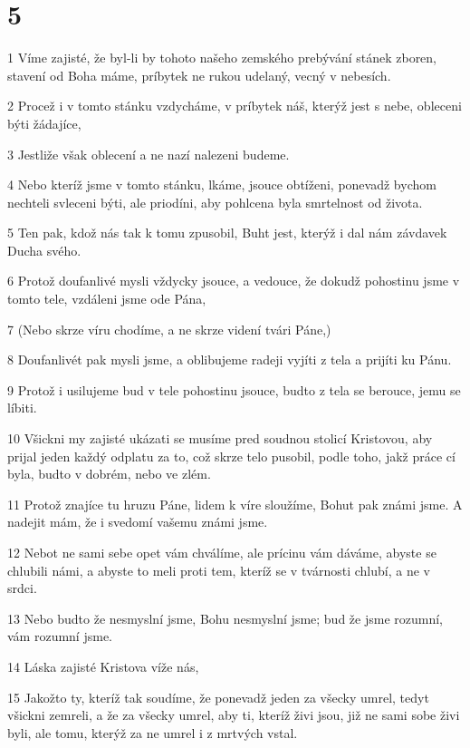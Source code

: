 \chapter{5}

\par 1 Víme zajisté, že byl-li by tohoto našeho zemského prebývání stánek zboren, stavení od Boha máme, príbytek ne rukou udelaný, vecný v nebesích.
\par 2 Procež i v tomto stánku vzdycháme, v príbytek náš, kterýž jest s nebe, obleceni býti žádajíce,
\par 3 Jestliže však oblecení a ne nazí nalezeni budeme.
\par 4 Nebo kteríž jsme v tomto stánku, lkáme, jsouce obtíženi, ponevadž bychom nechteli svleceni býti, ale priodíni, aby pohlcena byla smrtelnost od života.
\par 5 Ten pak, kdož nás tak k tomu zpusobil, Buht jest, kterýž i dal nám závdavek Ducha svého.
\par 6 Protož doufanlivé mysli vždycky jsouce, a vedouce, že dokudž pohostinu jsme v tomto tele, vzdáleni jsme ode Pána,
\par 7 (Nebo skrze víru chodíme, a ne skrze videní tvári Páne,)
\par 8 Doufanlivét pak mysli jsme, a oblibujeme radeji vyjíti z tela a prijíti ku Pánu.
\par 9 Protož i usilujeme bud v tele pohostinu jsouce, budto z tela se berouce, jemu se líbiti.
\par 10 Všickni my zajisté ukázati se musíme pred soudnou stolicí Kristovou, aby prijal jeden každý odplatu za to, což skrze telo pusobil, podle toho, jakž práce cí byla, budto v dobrém, nebo ve zlém.
\par 11 Protož znajíce tu hruzu Páne, lidem k víre sloužíme, Bohut pak známi jsme. A nadejit mám, že i svedomí vašemu známi jsme.
\par 12 Nebot ne sami sebe opet vám chválíme, ale prícinu vám dáváme, abyste se chlubili námi, a abyste to meli proti tem, kteríž se v tvárnosti chlubí, a ne v srdci.
\par 13 Nebo budto že nesmyslní jsme, Bohu nesmyslní jsme; bud že jsme rozumní, vám rozumní jsme.
\par 14 Láska zajisté Kristova víže nás,
\par 15 Jakožto ty, kteríž tak soudíme, že ponevadž jeden za všecky umrel, tedyt všickni zemreli, a že za všecky umrel, aby ti, kteríž živi jsou, již ne sami sobe živi byli, ale tomu, kterýž za ne umrel i z mrtvých vstal.
